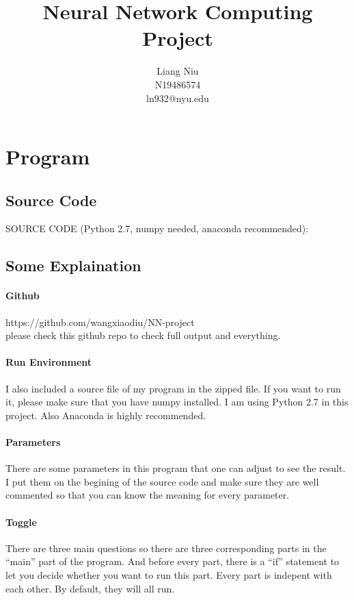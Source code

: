 \documentclass{article}
\title{Neural Network Computing\\Project}
\author{Liang Niu\\N19486574\\ln932@nyu.edu}
\begin{document}
  \maketitle %

  \section{Program}
  \subsection{Source Code}
    SOURCE CODE (Python 2.7, numpy needed, anaconda recommended):
    
  \subsection{Some Explaination}
  \paragraph{Github}
  https://github.com/wangxiaodiu/NN-project\\
  please check this github repo to check full output and everything.
  \paragraph{Run Environment}
  I also included a source file of my program in the zipped file. If you want to
  run it, please make sure that you have numpy installed. I am using Python 2.7
  in this project. Also Anaconda is highly recommended.
  \paragraph{Parameters}
  There are some parameters in this program that one can adjust to see the
  result. I put them on the begining of the source code and make sure they are
  well commented so that you can know the meaning for every parameter. 
  \paragraph{Toggle}
  There are three main questions so there are three corresponding parts in the
  ``main'' part of the program. And before every part, there is a ``if''
  statement to let you decide whether you want to run this part. Every part is
  indepent with each other. By default, they will all run.
\end{document}
